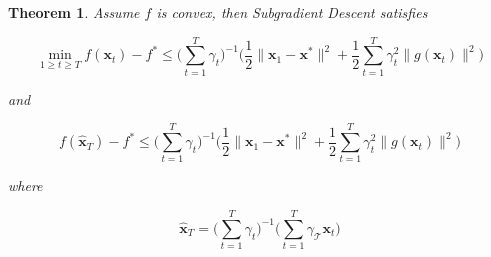 \documentclass{article}
\newtheorem{theorem}{Theorem}[section]
\begin{document}
		\begin{theorem}
			Assume $f$ is convex, then Subgradient Descent satisfies
			
			\[ \min_{1\ge t\ge T} f(\mathbf{x}_t) - f^* \le \bigg( \sum^T_{t=1} \gamma_t \bigg)^{-1} \bigg(\frac{1}{2} \|\mathbf{x}_1-\mathbf{x}^*\|^2 + \frac{1}{2}\sum^T_{t=1} \gamma^2_t \|g(\mathbf{x}_t)\|^2  \bigg) \]
			
			and
			
			\[f(\mathbf{\hat{x}}_T) - f^* \le \bigg( \sum^T_{t=1} \gamma_t \bigg)^{-1} \bigg(\frac{1}{2} \|\mathbf{x}_1-\mathbf{x}^*\|^2 + \frac{1}{2}\sum^T_{t=1} \gamma^2_t \|g(\mathbf{x}_t)\|^2  \bigg) \]
			
			where
			
			\[\mathbf{ \hat{x}}_T  = \bigg( \sum^T_{t=1}\gamma_t \bigg)^{-1}\bigg( \sum^T_{t=1} \gamma_\mathcal{T} \mathbf{x}_t \bigg)\]
		\end{theorem}
		
\end{document}
